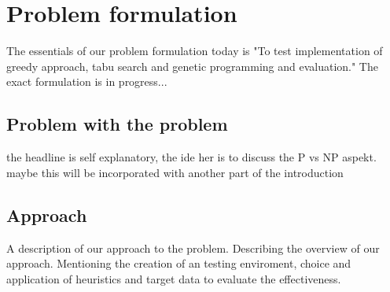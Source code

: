\chapter{Problem formulation}
The essentials of our problem formulation today is "To test
implementation of greedy approach, tabu search and genetic programming
and evaluation." The exact formulation is in progress...

\section{Problem with the problem}
the headline is self explanatory, the ide her is to discuss the P vs NP aspekt.
maybe this will be incorporated with another part of the introduction


\section{Approach}
A description of our approach to the problem. Describing the overview
of our approach. Mentioning the creation of an testing enviroment,
choice and application of heuristics and target data to evaluate the effectiveness.


